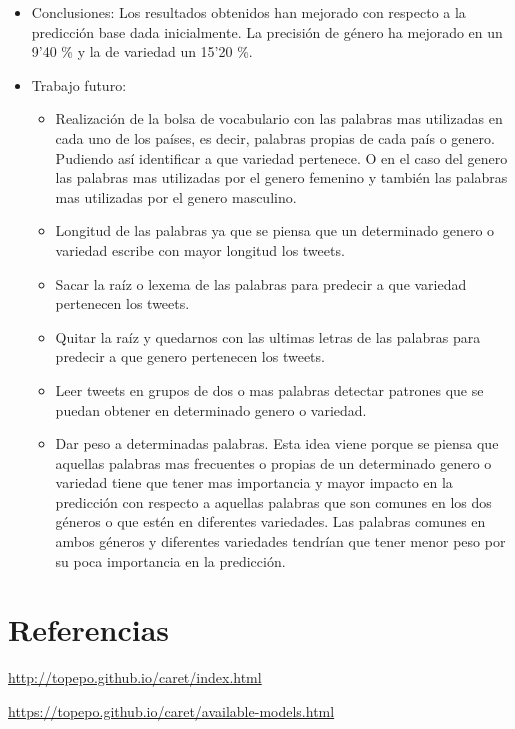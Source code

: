 \documentclass[11pt,a4paper]{article}
\begin{document}
  \begin{itemize}
  \item Conclusiones:
  Los resultados obtenidos han mejorado con respecto a la predicci\'on base dada inicialmente. La precisión de género ha mejorado en un 9'40 \% y la de variedad un 15'20 \%.
  

  \item Trabajo futuro:
  
  
    \begin{itemize}
    \item Realizaci\'on de la bolsa de vocabulario con las palabras mas utilizadas en cada uno de los pa\'ises, es decir, palabras propias de cada pa\'is o genero. Pudiendo as\'i identificar a que variedad pertenece. O en el caso del genero las palabras mas utilizadas por el genero femenino y tambi\'en las palabras mas utilizadas por el genero masculino.
    
    \item Longitud de las palabras ya que se piensa que un determinado genero o variedad escribe con mayor longitud los tweets.
    
    
    \item Sacar la ra\'iz o lexema de las palabras para predecir a que variedad pertenecen los tweets.
    
    
    \item Quitar la ra\'iz y quedarnos con las ultimas letras de las palabras para predecir a que genero pertenecen los tweets.    
    
    \item Leer tweets en grupos de dos o mas palabras detectar patrones que se puedan obtener en determinado genero o variedad.
    
    
    \item Dar peso a determinadas palabras. Esta idea viene porque se piensa que aquellas palabras mas frecuentes o propias de un determinado genero o variedad tiene que tener mas importancia y mayor impacto en la predicci\'on con respecto a aquellas palabras que son comunes en los dos g\'eneros o que est\'en en diferentes variedades. Las palabras comunes en ambos g\'eneros y diferentes variedades tendr\'ian que tener menor peso por su poca importancia en la predicci\'on.
    
    \end{itemize}
  
  \end{itemize}


\section{Referencias}

\url{http://topepo.github.io/caret/index.html}

\url{https://topepo.github.io/caret/available-models.html}
\end{document}
